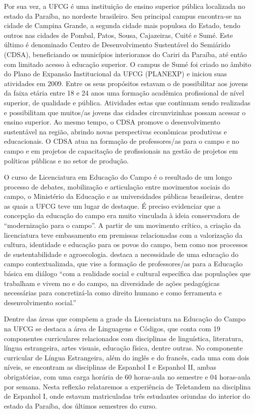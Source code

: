 \documentclass[portuguese]{textolivre}
\begin{document}
Por sua vez, a UFCG é uma instituição de ensino superior pública localizada no estado da Paraíba, no nordeste brasileiro. Seu principal campus encontra-se na cidade de Campina Grande, a segunda cidade mais populosa do Estado, tendo outros nas cidades de Pombal, Patos, Sousa, Cajazeiras, Cuité e Sumé. Este último é denominado Centro de Desenvolvimento Sustentável do Semiárido (CDSA), beneficiando os municípios interioranos do Cariri da Paraíba, até então com limitado acesso à educação superior. O campus de Sumé foi criado no âmbito do Plano de Expansão Institucional da UFCG (PLANEXP) e iniciou suas atividades em 2009. Entre os seus propósitos estavam o de possibilitar aos jovens da faixa etária entre 18 e 24 anos uma formação acadêmica profissional de nível superior, de qualidade e pública. Atividades estas que continuam sendo realizadas e possibilitam que muitos/as jovens das cidades circunvizinhas possam acessar o ensino superior. Ao mesmo tempo, o CDSA promove o desenvolvimento sustentável na região, abrindo novas perspectivas econômicas produtivas e educacionais. O CDSA atua na formação de professores/as para o campo e no campo e em projetos de capacitação de profissionais na gestão de projetos em políticas públicas e no setor de produção. 

O curso de Licenciatura em Educação do Campo é o resultado de um longo processo de debates, mobilização e articulação entre movimentos sociais do campo, o Ministério da Educação e as universidades públicas brasileiras, dentre as quais a UFCG teve um lugar de destaque. É preciso evidenciar que a concepção da educação do campo era muito vinculada à ideia conservadora de “modernização para o campo”. A partir de um movimento crítico, a criação da licenciatura teve embasamento em premissas relacionadas com a valorização da cultura, identidade e educação para os povos do campo, bem como nos processos de sustentabilidade e agroecologia. \textcite{silva2011construccao} destaca a necessidade de uma educação do campo contextualizada, que vise a formação de professores/as para a Educação básica em diálogo “com a realidade social e cultural específica das populações que trabalham e vivem no e do campo, na diversidade de ações pedagógicas necessárias para concretizá-la como direito humano e como ferramenta e desenvolvimento social.” \cite[p.415]{silva2011construccao}

Dentre das áreas que compõem a grade da Licenciatura na Educação do Campo na UFCG se destaca a área de Linguagens e Códigos, que conta com 19 componentes curriculares relacionados com disciplinas de linguística, literatura, língua estrangeira, artes visuais, educação física, dentre outras. No componente curricular de Língua Estrangeira, além do inglês e do francês, cada uma com dois níveis, se encontram as disciplinas de Espanhol I e Espanhol II, ambas obrigatórias, com uma carga horária de 60 horas-aula no semestre e 04 horas-aula por semana. Nesta reflexão relataremos a experiência de Teletandem na disciplina de Espanhol I, onde estavam matriculadas três estudantes oriundas do interior do estado da Paraíba, dos últimos semestres do curso.
\end{document}
